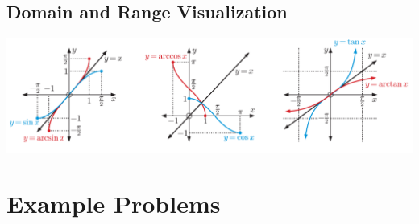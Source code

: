 \documentclass{article}
\begin{document}
\subsection*{Domain and Range Visualization}

\begin{center}
    \includegraphics[width=\textwidth]{Screenshot 2024-05-14 192525.png}
\end{center}

\section*{Example Problems}
\end{document}

